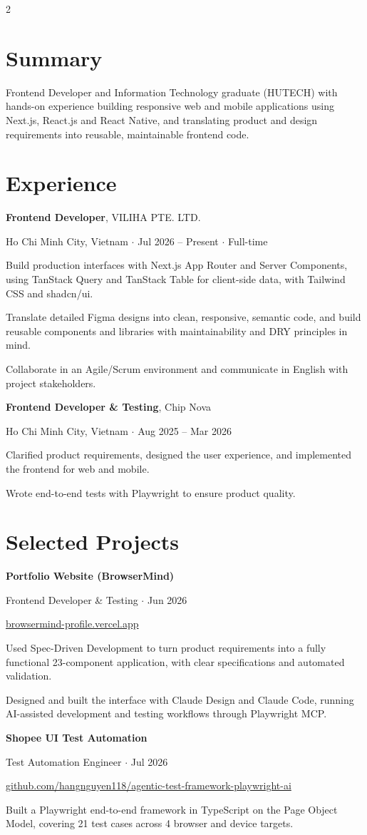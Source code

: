 \documentclass[11pt,a4paper]{article}
\newcommand{\cvsection}[1]{\section*{#1}}
\newcommand{\cvsummary}[1]{#1\par\vspace{0.1em}}
\newcommand{\cvitem}[2]{%
  \vspace{0.3em}%
  #1\par
  {\small\color{muted}#2}\par
}
\newcommand{\cvlinks}[1]{{\small\color{muted}#1}\par\vspace{0.1em}}
\begin{document}
\begin{paracol}{2}
\switchcolumn
\cvsection{Summary}
\cvsummary{Frontend Developer and Information Technology graduate (HUTECH) with hands-on experience building responsive web and mobile applications using Next.js, React.js and React Native, and translating product and design requirements into reusable, maintainable frontend code.}
\cvsection{Experience}
\cvitem{\textbf{Frontend Developer}, VILIHA PTE. LTD.}{Ho Chi Minh City, Vietnam $\cdot$ Jul 2026 – Present $\cdot$ Full-time}
\begin{cvbullets}
  \item Build production interfaces with Next.js App Router and Server Components, using TanStack Query and TanStack Table for client-side data, with Tailwind CSS and shadcn/ui.
  \item Translate detailed Figma designs into clean, responsive, semantic code, and build reusable components and libraries with maintainability and DRY principles in mind.
  \item Collaborate in an Agile/Scrum environment and communicate in English with project stakeholders.
\end{cvbullets}
\cvitem{\textbf{Frontend Developer \& Testing}, Chip Nova}{Ho Chi Minh City, Vietnam $\cdot$ Aug 2025 – Mar 2026}
\begin{cvbullets}
  \item Clarified product requirements, designed the user experience, and implemented the frontend for web and mobile.
  \item Wrote end-to-end tests with Playwright to ensure product quality.
\end{cvbullets}
\cvsection{Selected Projects}
\cvitem{\textbf{Portfolio Website (BrowserMind)}}{Frontend Developer \& Testing $\cdot$ Jun 2026}
\cvlinks{\href{https://browsermind-profile.vercel.app}{browsermind-profile.vercel.app}}
\begin{cvbullets}
  \item Used Spec-Driven Development to turn product requirements into a fully functional 23-component application, with clear specifications and automated validation.
  \item Designed and built the interface with Claude Design and Claude Code, running AI-assisted development and testing workflows through Playwright MCP.
\end{cvbullets}
\cvitem{\textbf{Shopee UI Test Automation}}{Test Automation Engineer $\cdot$ Jul 2026}
\cvlinks{\href{https://github.com/hangnguyen118/agentic-test-framework-playwright-ai}{github.com/hangnguyen118/agentic-test-framework-playwright-ai}}
\begin{cvbullets}
  \item Built a Playwright end-to-end framework in TypeScript on the Page Object Model, covering 21 test cases across 4 browser and device targets.
\end{cvbullets}

\end{paracol}
\end{document}
